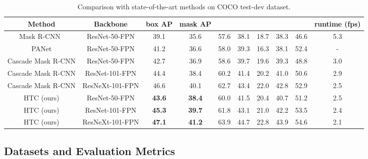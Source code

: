 \documentclass[10pt,twocolumn,letterpaper]{article}
\begin{document}
\begin{table*}[htb]
	\centering
	\caption{Comparison with state-of-the-art methods on COCO test-dev dataset.}
	\vspace{0.1cm}
	\addtolength{\tabcolsep}{-1pt}
	\begin{tabular}{*{10}{c}}
		\toprule
		Method                       & Backbone        & box AP & mask AP &  &  &  &  &  & runtime (fps) \\
		\midrule
		Mask R-CNN~\cite{he2017mask} & ResNet-50-FPN   & 39.1   & 35.6    & 57.6             & 38.1             & 18.7            & 38.3            & 46.6            & 5.3           \\
		PANet\cite{liu2018path}      & ResNet-50-FPN   & 41.2   & 36.6    & 58.0             & 39.3             & 16.3            & 38.1            & 52.4            & -             \\
		\midrule
		Cascade Mask R-CNN           & ResNet-50-FPN   & 42.7   & 36.9    & 58.6             & 39.7             & 19.6            & 39.3            & 48.8            & 3.0           \\
		Cascade Mask R-CNN           & ResNet-101-FPN  & 44.4   & 38.4    & 60.2             & 41.4             & 20.2            & 41.0            & 50.6            & 2.9           \\
		Cascade Mask R-CNN           & ResNeXt-101-FPN & 46.6   & 40.1    & 62.7             & 43.4             & 22.0            & 42.8            & 52.9            & 2.5           \\
		\midrule
		HTC (ours)                   & ResNet-50-FPN   & \textbf{43.6}   & \textbf{38.4}    & 60.0             & 41.5             & 20.4            & 40.7            & 51.2            & 2.5           \\
		HTC (ours)                   & ResNet-101-FPN  & \textbf{45.3}   & \textbf{39.7}    & 61.8             & 43.1             & 21.0            & 42.2            & 53.5            & 2.4           \\
		HTC (ours)                   & ResNeXt-101-FPN & \textbf{47.1}   & \textbf{41.2}    & 63.9             & 44.7             & 22.8            & 43.9            & 54.6            & 2.1           \\
		\bottomrule
	\end{tabular}
	\label{tab:overall-results}
\end{table*}

\subsection{Datasets and Evaluation Metrics}
\end{document}
